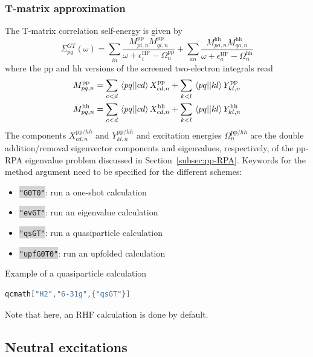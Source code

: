 \documentclass[aip,jcp,reprint,noshowkeys,superscriptaddress]{revtex4-1}
\newcommand{\GT}{\text{$GT$}}
\newcommand{\HF}{\text{HF}}
\newcommand{\pp}{\text{pp}}
\newcommand{\hh}{\text{hh}}
\newcommand{\ep}{\epsilon}
\newcommand{\Sigm}{\Sigma}
\newcommand{\pERI}[2]{\mel{#1}{}{#2}}
\newcommand{\sERI}[2]{M_{#1}^{#2}}
\newcommand{\Ome}{\Omega}
\newcommand{\keyword}[1]{{\colorbox{lightgray}{\texttt{#1}}}}
\begin{document}
\subsubsection*{T-matrix approximation}
The T-matrix correlation self-energy is given by
\begin{equation}
	\Sigm_{pq}^{\GT}(\omega) 
	= \sum_{in} \frac{\sERI{pi,n}{\pp}\sERI{qi,n}{\pp}}{\omega + \ep_{i}^{\HF} - \Ome_{n}^{\pp}}
	+ \sum_{an} \frac{\sERI{pa,n}{\hh}\sERI{qa,n}{\hh}}{\omega + \ep_{a}^{\HF} - \Ome_{n}^{\hh}}
\end{equation}
where the pp and hh versions of the screened two-electron integrals read
\begin{subequations}
\begin{align}
	\sERI{pq,n}{\pp} 
	& = \sum_{c<d} \pERI{pq}{cd} X_{cd,n}^{\pp} 
	+ \sum_{k<l} \pERI{pq}{kl} Y_{kl,n}^{\pp}
	\\
	\sERI{pq,n}{\hh} 
	& = \sum_{c<d} \pERI{pq}{cd} X_{cd,n}^{\hh} 
	+ \sum_{k<l} \pERI{pq}{kl} Y_{kl,n}^{\hh} 
\end{align}
\end{subequations}
The components $X_{cd,n}^{\pp/hh}$ and $Y_{kl,n}^{\pp/hh}$ and excitation energies $\Ome_{n}^{\pp/hh}$ are the double addition/removal eigenvector components and eigenvalues, respectively, of the pp-RPA eigenvalue problem discussed in Section~\ref{subsec:pp-RPA}.
Keywords for the method argument need to be specified for the different schemes: 
\begin{itemize}
\item \keyword{"G0T0"}: run a one-shot calculation
\item \keyword{"evGT"}: run an eigenvalue calculation 
\item \keyword{"qsGT"}: run a quasiparticle calculation 
\item \keyword{"upfG0T0"}: run an upfolded calculation
\end{itemize}
Example of a quasiparticle calculation
\begin{lstlisting}[extendedchars=true,language=Mathematica]
	qcmath["H2","6-31g",{"qsGT"}]
\end{lstlisting}
Note that here, an RHF calculation is done by default.

\subsection{Neutral excitations}
\end{document}
